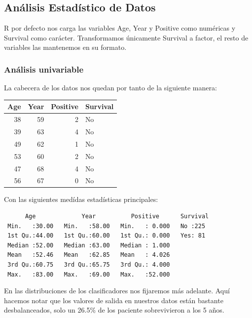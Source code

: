 \subsection{Análisis Estadístico de Datos}

R por defecto nos carga las variables Age, Year y Positive como numéricas y Survival como carácter.
Transformamos únicamente Survival a factor, el resto de variables las mantenemos en su formato.

\subsubsection{Análisis univariable}

La cabecera de los datos nos quedan por tanto de la siguiente manera:
\vspace{\baselineskip}

\begin{tabular}{r|r|r|l}
    \hline
    Age & Year & Positive & Survival\\
    \hline
    38 & 59 & 2 & No\\
    \hline
    39 & 63 & 4 & No\\
    \hline
    49 & 62 & 1 & No\\
    \hline
    53 & 60 & 2 & No\\
    \hline
    47 & 68 & 4 & No\\
    \hline
    56 & 67 & 0 & No\\
    \hline
\end{tabular}

Con las siguientes medídas estadísticas principales:

\begin{verbatim}
      Age             Year          Positive      Survival 
 Min.   :30.00   Min.   :58.00   Min.   : 0.000   No :225  
 1st Qu.:44.00   1st Qu.:60.00   1st Qu.: 0.000   Yes: 81  
 Median :52.00   Median :63.00   Median : 1.000            
 Mean   :52.46   Mean   :62.85   Mean   : 4.026            
 3rd Qu.:60.75   3rd Qu.:65.75   3rd Qu.: 4.000            
 Max.   :83.00   Max.   :69.00   Max.   :52.000            
\end{verbatim}

En las distribuciones de los clasificadores nos fijaremos más adelante. Aquí hacemos notar que los valores de salida en nuestros datos están bastante desbalanceados, solo un 26.5\% de los paciente sobrevivieron a los 5 años.

\vspace{\baselineskip}

